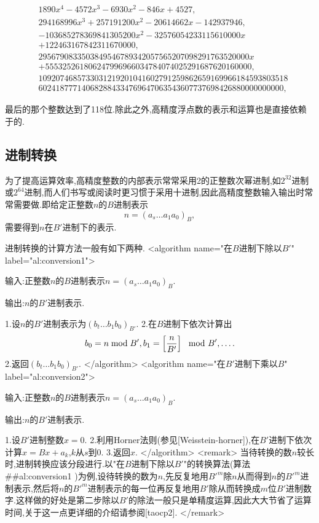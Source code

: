 \documentclass{ctexart}
\newcommand\mtcasCite[1]{[#1]}
\begin{document}
\begin{align*}
&1890x^4-4572x^3-6930x^2-846x+4527,\\
&294168996x^3+257191200x^2-20614662x-142937946,\\
&-103685278369841305200x^2-32576054233115610000x\\
&+122463167842311670000,\\
&2956790833503849546789342057565207098291763520000x\\
&+555325261806247996966034784074025291687620160000,\\
&1092074685733031219201041602791259862659169966184593803518\\
&602418777140682884334769647063543607737698426880000000000,
\end{align*}

最后的那个整数达到了118位.除此之外,高精度浮点数的表示和运算也是直接依赖于的.

\subsection{进制转换}

为了提高运算效率,高精度整数的内部表示常常采用2的正整数次幂进制,如$2^{32}$进制或$2^{64}$进制,而人们书写或阅读时更习惯于采用十进制,因此高精度整数输入输出时常常需要做.即给定正整数$n$的$B$进制表示$$n=(a_s\ldots a_1a_0)_B,$$需要得到$n$在$B'$进制下的表示.

进制转换的计算方法一般有如下两种.
<algorithm  name="在$B$进制下除以$B'$" label="al:conversion1">

输入:正整数$n$的$B$进制表示$n=(a_s\ldots a_1a_0)_B$.

输出:$n$的$B'$进制表示.

 1.设$n$的$B'$进制表示为$(b_t \ldots b_1b_0)_{B'}$.
 2.在$B$进制下依次计算出$$b_0=n\bmod B',b_1=\left[{n\over B'}\right]\mod B',\ldots.$$
 2.返回$(b_t\ldots b_1b_0)_{B'}$.
</algorithm>
<algorithm name="在$B'$进制下乘以$B$" label="al:conversion2">

输入:正整数$n$的$B$进制表示$n=(a_s\ldots a_1a_0)_B$.

输出:$n$的$B'$进制表示.

 1.设$B'$进制整数$x=0$.
 2.利用Horner法则(参见\mtcasCite{Weisstein-horner}),在$B'$进制下依次计算$x=Bx+a_k$,$k$从$s$到0.
 3.返回$x$.
</algorithm>
<remark>
当待转换的数$n$较长时,进制转换应该分段进行.以"在$B$进制下除以$B'$"的转换算法(算法##al:conversion1
)为例,设待转换的数为$n$,先反复地用$B'^m$除$n$从而得到$n$的$B'^m$进制表示,然后将$n$的$B'^m$进制表示的每一位再反复地用$B'$除从而转换成$m$位$B'$进制数字.这样做的好处是第二步除以$B'$的除法一般只是单精度运算,因此大大节省了运算时间,关于这一点更详细的介绍请参阅\mtcasCite{taocp2}.
</remark>
\end{document}
